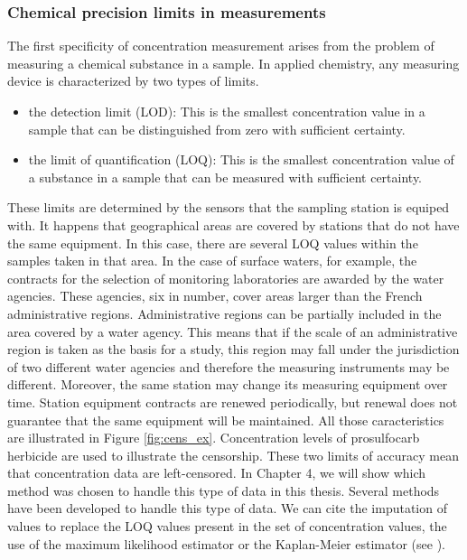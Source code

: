 \subsubsection{Chemical precision limits in measurements}

The first specificity of concentration measurement arises from the problem of measuring a chemical substance in a sample. In applied chemistry, any measuring device is characterized by two types of limits. 

\begin{itemize}
    \item the detection limit (LOD): This is the smallest concentration value in a sample that can be distinguished from zero with sufficient certainty.
    \item the limit of quantification (LOQ): This is the smallest concentration value of a substance in a sample that can be measured with  sufficient certainty. 
\end{itemize}

These limits are determined by the sensors that the sampling station is equiped with. It happens that geographical areas are covered by stations that do not have the same equipment. In this case, there are several LOQ values within the samples taken in that area. In the case of surface waters, for example, the contracts for the selection of monitoring laboratories are awarded by the water agencies. These agencies, six in number, cover areas larger than the French administrative regions. Administrative regions can be partially included in the area covered by a water agency. This means that if the scale of an administrative region is taken as the basis for a study, this region may fall under the jurisdiction of two different water agencies and therefore the measuring instruments may be different. Moreover, the same station may change its measuring equipment over time. Station equipment contracts are renewed periodically, but renewal does not guarantee that the same equipment will be maintained. All those caracteristics are illustrated in Figure \ref{fig:cens_ex}. Concentration levels of prosulfocarb herbicide are used to illustrate the censorship. These two limits of accuracy mean that concentration data are left-censored. In Chapter 4, we will show which method was chosen to handle this type of data in this thesis. Several methods have been developed to handle this type of data. We can cite the imputation of values to replace the LOQ values present in the set of concentration values, the use of the maximum likelihood estimator or the Kaplan-Meier estimator (see \cite{Gillaizeau2020,Croghan2003MethodsOD}). 

